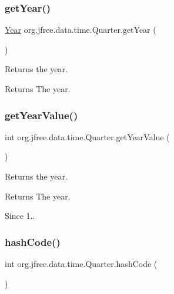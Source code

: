 \subsubsection{\texorpdfstring{get\+Year()}{getYear()}}
{\footnotesize\ttfamily \mbox{\hyperlink{classorg_1_1jfree_1_1data_1_1time_1_1_year}{Year}} org.\+jfree.\+data.\+time.\+Quarter.\+get\+Year (\begin{DoxyParamCaption}{ }\end{DoxyParamCaption})}

Returns the year.

\begin{DoxyReturn}{Returns}
The year. 
\end{DoxyReturn}
\mbox{\label{classorg_1_1jfree_1_1data_1_1time_1_1_quarter_a7fc49b916be40b1631cc3ce6568a9879}} 
\subsubsection{\texorpdfstring{get\+Year\+Value()}{getYearValue()}}
{\footnotesize\ttfamily int org.\+jfree.\+data.\+time.\+Quarter.\+get\+Year\+Value (\begin{DoxyParamCaption}{ }\end{DoxyParamCaption})}

Returns the year.

\begin{DoxyReturn}{Returns}
The year.
\end{DoxyReturn}
\begin{DoxySince}{Since}
1.. 
\end{DoxySince}
\mbox{\label{classorg_1_1jfree_1_1data_1_1time_1_1_quarter_a0143f30f3ec9df7425cd9812e3caf1dd}} 
\subsubsection{\texorpdfstring{hash\+Code()}{hashCode()}}
{\footnotesize\ttfamily int org.\+jfree.\+data.\+time.\+Quarter.\+hash\+Code (\begin{DoxyParamCaption}{ }\end{DoxyParamCaption})}

